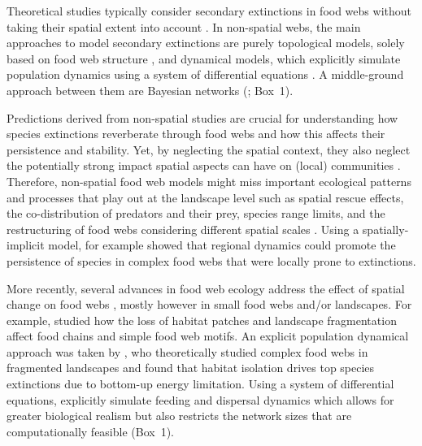 \documentclass[11pt]{article}
\begin{document}
Theoretical studies typically consider secondary extinctions in food webs without taking their spatial extent into account \citep{EklofEbenman2006, Dunne2009, Staniczenko2010, Binzer2011, Curtsdotter2011, Broseetal2017}. In non-spatial webs, the main approaches to model secondary extinctions are purely topological models, solely based on food web structure \citep{Dunne2009}, and dynamical models, which explicitly simulate population dynamics using a system of differential equations \citep{Binzer2011, Curtsdotter2011}. A middle-ground approach between them are Bayesian networks (\citealp{Eklofetal2013MEE}; Box~1).

Predictions derived from non-spatial studies are crucial for understanding how species extinctions reverberate through food webs and how this affects their persistence and stability. Yet, by neglecting the spatial context, they also neglect the potentially strong impact spatial aspects can have on (local) communities \citep{GibertYeakel2019}. Therefore, non-spatial food web models might miss important ecological patterns and processes that play out at the landscape level such as spatial rescue effects, the co-distribution of predators and their prey, species range limits, and the restructuring of food webs considering different spatial scales \citep{Guzman2018}. Using a spatially-implicit model, \citet{Gravel2011PONE} for example showed that regional dynamics could promote the persistence of species in complex food webs that were locally prone to extinctions. 

More recently, several advances in food web ecology address the effect of spatial change on food webs \citep{Pillai2011, Eklof2012}, mostly however in small food webs and/or landscapes. For example, \citet{Liao2016, Liao2017JAE, Liao2017RSPB} studied how the loss of habitat patches and landscape fragmentation affect food chains and simple food web motifs. An explicit population dynamical approach was taken by \citet{Ryser2019}, who theoretically studied complex food webs in fragmented landscapes and found that habitat isolation drives top species extinctions due to bottom-up energy limitation. Using a system of differential equations, \citet{Ryser2019} explicitly simulate feeding and dispersal dynamics which allows for greater biological realism but also restricts the network sizes that are computationally feasible (Box~1).
\end{document}
